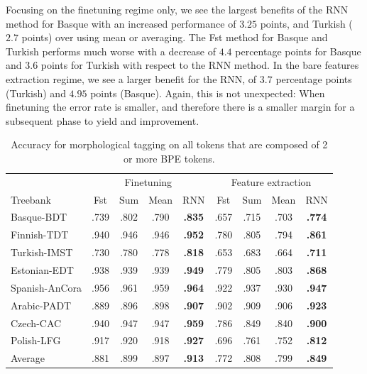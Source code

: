 \documentclass[11pt]{article}
\newcommand\jp[1]{(\textbf{JP:} #1)}
\begin{document}
                Focusing on the finetuning regime only, we see the
     largest benefits of the RNN method for Basque with an increased
     performance of $3.25$ points, and Turkish ($2.7$ points) over
     using mean or averaging. The Fst method for Basque and Turkish
     performs much worse with a decrease of $4.4$ percentage points
     for Basque and $3.6$ points for Turkish with respect to the RNN method.
        In the bare features extraction regime, we see a larger
     benefit for the RNN, of $3.7$ percentage points (Turkish) and
     $4.95$ points (Basque). Again, this is not unexpected: When
     finetuning the error rate is smaller, and therefore there is a
     smaller margin for a subsequent phase to yield and improvement.
    

    
	\begin{table}%
	\centering
	\begin{tabular}{l|cccc|cccc}
		 & \multicolumn{4}{c}{Finetuning} & \multicolumn{4}{c}{Feature extraction} \\
		Treebank & Fst & Sum & Mean & RNN & Fst & Sum & Mean & RNN  \\
		 \hline
        Basque-BDT      & .739 & .802 & .790 & \textbf{.835} & .657 & .715 & .703 & \textbf{.774} \\
		Finnish-TDT     & .940 & .946 & .946 & \textbf{.952} & .780 & .805 & .794 & \textbf{.861} \\ 
		Turkish-IMST    & .730 & .780 & .778 & \textbf{.818} & .653 & .683 & .664 & \textbf{.711} \\
		Estonian-EDT    & .938 & .939 & .939 & \textbf{.949} & .779 & .805 & .803 & \textbf{.868} \\
		Spanish-AnCora  & .956 & .961 & .959 & \textbf{.964} & .922 & .937 & .930 & \textbf{.947} \\
		Arabic-PADT     & .889 & .896 & .898 & \textbf{.907} & .902 & .909 & .906 & \textbf{.923}\\
		Czech-CAC       & .940 & .947 & .947 & \textbf{.959} & .786 & .849 & .840 & \textbf{.900} \\
		Polish-LFG      & .917 & .920 & .918 & \textbf{.927} & .696 & .761 & .752 & \textbf{.812} \\
        \hline
        Average         & .881 & .899 & .897 & \textbf{.913} & .772 & .808 & .799 & \textbf{.849} \\
	\end{tabular}
    \caption{\label{tab:results_large_tokens} Accuracy for
     morphological tagging on all tokens that are composed of 2 or
     more BPE tokens.}
\end{table}
\end{document}
